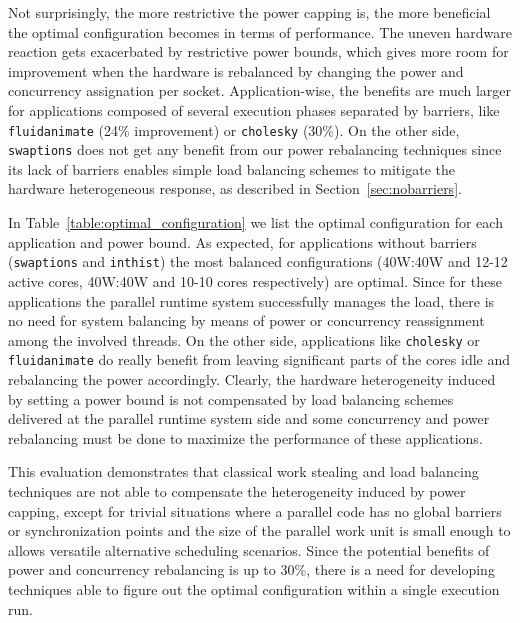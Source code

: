 Not surprisingly, the more restrictive the power capping is, the more beneficial the
optimal configuration becomes in terms of performance.  The uneven hardware reaction gets
exacerbated by restrictive power bounds, which gives more room for improvement when the
hardware is rebalanced by changing the power and concurrency assignation per socket.
Application-wise, the benefits are much larger for applications %
composed of several execution phases separated by barriers, like \texttt{fluidanimate}
(24\% improvement) or \texttt{cholesky} (30\%).  On the other side, \texttt{swaptions}
does not get any benefit from our power rebalancing techniques since its lack of barriers
enables simple load balancing schemes to mitigate the hardware heterogeneous response, as
described in Section~\ref{sec:nobarriers}.

In Table~\ref{table:optimal_configuration} we list the optimal configuration for each
application and power bound.  As expected, for applications without barriers
(\texttt{swaptions} and \texttt{inthist}) the most balanced configurations (40W:40W and
12-12 active cores, 40W:40W and 10-10 cores respectively)  are optimal.  Since for these
applications the parallel runtime system successfully manages the load, there is no need
for system balancing by means of power or concurrency reassignment among the involved
threads.  On the other side, applications like \texttt{cholesky} or \texttt{fluidanimate}
do really benefit from leaving significant parts of the cores idle and rebalancing the
power accordingly.  Clearly, the hardware heterogeneity induced by setting a power bound
is not compensated by load balancing schemes delivered at the parallel runtime system side
and some concurrency and power rebalancing must be done to maximize the performance of
these applications.

This evaluation demonstrates that classical work stealing and load balancing techniques
are not able to compensate the heterogeneity induced by power capping, except for trivial
situations where a parallel code has no global barriers or synchronization points and the
size of the parallel work unit is small enough to allows versatile alternative scheduling
scenarios.  Since the potential benefits of power and concurrency rebalancing is up to
30\%, there is a need for developing techniques able to figure out the optimal
configuration within a single execution run. 



